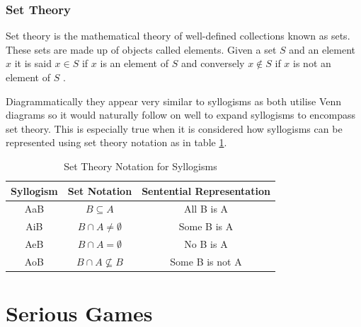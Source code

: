 \documentclass[12pt,a4paper]{report}
\begin{document}
\subsubsection{Set Theory}
Set theory is the mathematical theory of well-defined collections known as sets. These sets are made up of objects called elements. Given a set $S$ and an element $x$ it is said $x \in S$ if $x$ is an element of $S$ and conversely $x \notin S$ if $x$ is not an element of $S$ \citep{sep-set-theory}.

Diagrammatically they appear very similar to syllogisms as both utilise Venn diagrams so it would naturally follow on well to expand syllogisms to encompass set theory. This is especially true when it is considered how syllogisms can be represented using set theory notation as in table \ref{tbl:setTheoryNotationTable}.
 
\begin{table}[h!]
\begin{center}
  \begin{tabular}{ c | c | c }
    Syllogism & Set Notation & Sentential Representation \\ \hline
    AaB & $B \subseteq A$ & All B is A \\
    AiB & $B \cap A \neq \emptyset$ & Some B is A \\
    AeB & $B \cap A = \emptyset$ & No B is A \\
    AoB & $B \cap A \nsubseteq B$ & Some B is not A \\
  \end{tabular}
   \caption{Set Theory Notation for Syllogisms}
  \label{tbl:setTheoryNotationTable}
\end{center}
\end{table}


\section{Serious Games}
\end{document}
